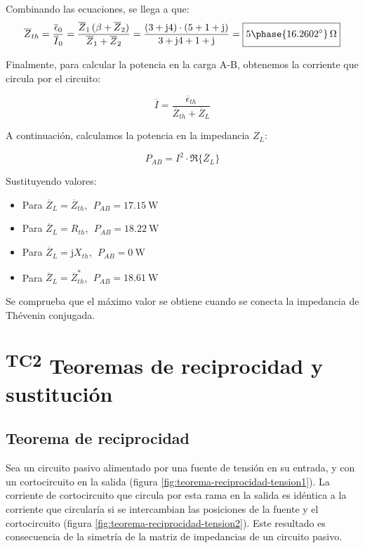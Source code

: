 \begin{example}
Combinando las ecuaciones, se llega a que:
\begin{equation*}
  \overline{Z}_{th} = \dfrac{\overline{\epsilon}_0}{\overline{I}_0} = \dfrac{\overline{Z}_1\,(\beta + \overline{Z}_2)}{\overline{Z}_1+\overline{Z}_2}=\dfrac{(3+\mathrm{j}4)\cdot (5+1+\mathrm{j})}{3+\mathrm{j}4+1+\mathrm{j}} = \boxed{\vphantom{\frac{a}{a}} 5\phase{16.2602^\circ}\,\Omega}
\end{equation*}

Finalmente, para calcular la potencia en la carga A-B, obtenemos la corriente que circula por el circuito:

  \[
    \overline{I} = \dfrac{\overline{\epsilon}_{th}}{\overline{Z}_{th} + \overline{Z}_L}
  \]

A continuación, calculamos la potencia en la impedancia $Z_L$:
  
\begin{equation*}
  P_{AB} = I^2 \cdot \Re\{\overline{Z}_L\}
\end{equation*}

Sustituyendo valores:
\begin{itemize}
\item Para $\overline{Z}_L = \overline{Z}_{th}$,
  $\;P_{AB} = \qty{17.15}{\watt}$
\item Para $\overline{Z}_L = R_{th}$, $\;P_{AB} = \qty{18.22}{\watt}$
\item Para $\overline{Z}_L = \mathrm{j}X_{th}$,
  $\;P_{AB} = \qty{0}{\watt}$
\item Para $\overline{Z}_L = \overline{Z}_{th}^*$,
  $\;P_{AB} = \qty{18.61}{\watt}$
\end{itemize}

Se comprueba que el máximo valor se obtiene cuando se conecta la
impedancia de Thévenin conjugada.

\end{example}
	
\section{\textsuperscript{TC2} Teoremas de reciprocidad y sustitución}
\label{sec:orgaf3c617}

\subsection{Teorema de reciprocidad}
\label{sec:teorema-reciprocidad}

Sea un circuito pasivo alimentado por una fuente de tensión en su entrada, y con un cortocircuito en la salida (figura \ref{fig:teorema-reciprocidad-tension1}). La corriente de cortocircuito que circula por esta rama en la salida es idéntica a la corriente que circularía si se intercambian las posiciones de la fuente y el cortocircuito (figura \ref{fig:teorema-reciprocidad-tension2}). Este resultado es consecuencia de la simetría de la matriz de impedancias de un circuito pasivo.

